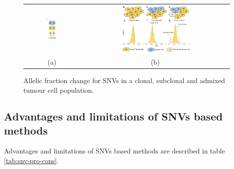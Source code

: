     \begin{figure}[H]
        \centering
        \begin{tabular}{cc}
          \includegraphics[width=0.2\textwidth]{SNVs.png} &   \includegraphics[width=0.5\textwidth]{peaks.png} \\
        (a)  & (b)  \\[6pt]
        \end{tabular}
        \caption{Allelic fraction change for SNVs in a clonal, subclonal and admixed tumour cell population.}
        \label{fig:snv-intro-cluster}
    \end{figure}

    \subsection{Advantages and limitations of SNVs based methods}
    Advantages and limitations of SNVs based methods are described in table \ref{tab:snv-pro-cons}.

